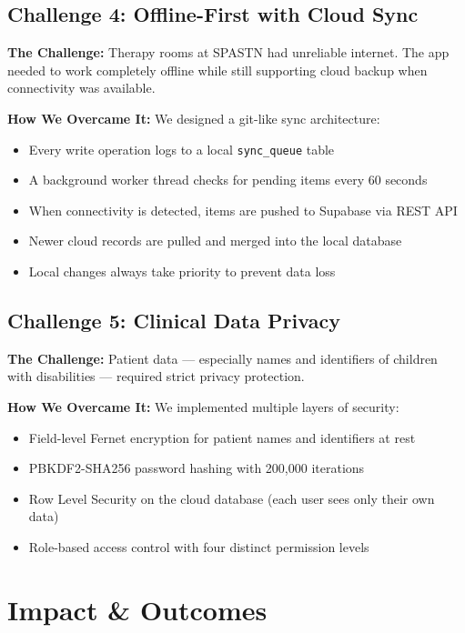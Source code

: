 \documentclass[11pt,a4paper]{article}
\begin{document}
\subsection{Challenge 4: Offline-First with Cloud Sync}

\textbf{The Challenge:} Therapy rooms at SPASTN had unreliable internet. The app needed to work completely offline while still supporting cloud backup when connectivity was available.

\textbf{How We Overcame It:} We designed a git-like sync architecture:
\begin{itemize}[leftmargin=2em, itemsep=2pt]
    \item Every write operation logs to a local \texttt{sync\_queue} table
    \item A background worker thread checks for pending items every 60 seconds
    \item When connectivity is detected, items are pushed to Supabase via REST API
    \item Newer cloud records are pulled and merged into the local database
    \item Local changes always take priority to prevent data loss
\end{itemize}

\subsection{Challenge 5: Clinical Data Privacy}

\textbf{The Challenge:} Patient data --- especially names and identifiers of children with disabilities --- required strict privacy protection.

\textbf{How We Overcame It:} We implemented multiple layers of security:
\begin{itemize}[leftmargin=2em, itemsep=2pt]
    \item Field-level Fernet encryption for patient names and identifiers at rest
    \item PBKDF2-SHA256 password hashing with 200,000 iterations
    \item Row Level Security on the cloud database (each user sees only their own data)
    \item Role-based access control with four distinct permission levels
\end{itemize}

\section{Impact \& Outcomes}
\end{document}
